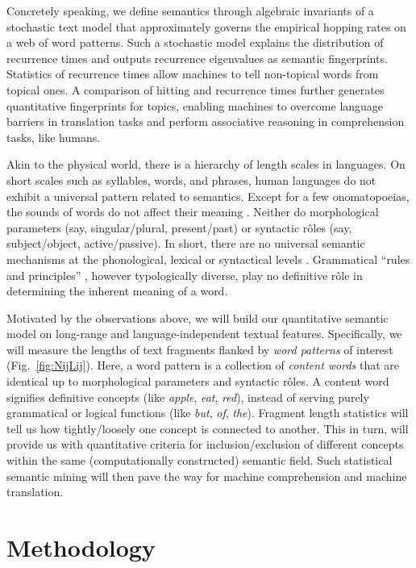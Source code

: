 \documentclass[10pt,journal,compsoc]{IEEEtran}
\begin{document}
Concretely speaking, we define semantics through algebraic invariants of a stochastic text model that approximately governs the empirical hopping rates on a web of word patterns. Such a stochastic model explains the distribution of recurrence times and outputs recurrence eigenvalues as semantic fingerprints. Statistics of recurrence times allow machines to tell non-topical words from topical ones. A comparison of hitting  and recurrence times further generates quantitative fingerprints for topics, enabling machines to overcome language barriers in translation tasks and perform associative reasoning in comprehension tasks,       like humans.

Akin to the physical world, there is a hierarchy of length scales in languages.  On short scales such as syllables, words, and phrases,  human languages do not  exhibit a universal pattern related to semantics. Except for a few onomatopoeias, the sounds of words do not affect their meaning \cite{Saussure1949}. Neither do morphological parameters \cite{Pinker1988} (say, singular/plural, present/past) or syntactic r\^oles \cite{Chomsky2002syntactic} (say, subject/object, active/passive).  In short, there are no universal semantic mechanisms at the phonological, lexical or syntactical levels \cite{Friederici1999}. Grammatical ``rules and principles'' \cite{Pinker1988,Chomsky2002syntactic}, however typologically diverse,  play no definitive r\^ole in determining the  inherent meaning of a word.


Motivated by the observations above, we will build our quantitative semantic model on long-range and language-independent textual features.  Specifically, we will measure the    lengths  of text fragments flanked by   \textit{word patterns} of interest   (Fig.~\ref{fig:NijLij}). Here, a word pattern is a collection of \textit{content words} that are identical up to morphological parameters and syntactic r\^oles. A content word signifies definitive concepts (like  \textit{apple}, \textit{eat}, \textit{red}), instead of serving purely grammatical or logical functions (like \textit{but}, \textit{of}, \textit{the}). Fragment length statistics will tell us how tightly/loosely one concept is connected to another. This in turn, will provide us with  quantitative criteria for inclusion/exclusion of different concepts within the same (computationally constructed) semantic field. Such statistical semantic  mining will then pave the way for  machine comprehension and machine translation.\section{Methodology}
\end{document}
